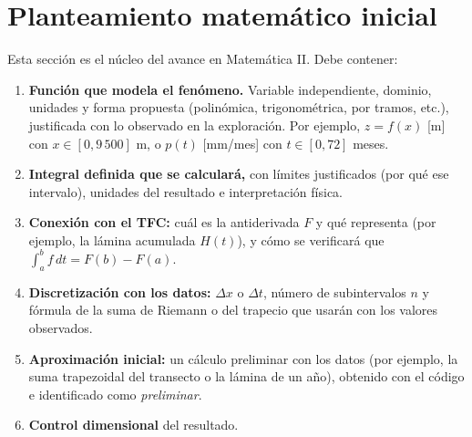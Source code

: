 \documentclass[11pt,a4paper]{article}
\begin{document}
\section{Planteamiento matemático inicial}

Esta sección es el núcleo del avance en Matemática II. Debe contener:
\begin{enumerate}[label=\alph*)]
  \item \textbf{Función que modela el fenómeno.} Variable independiente, dominio, unidades y forma propuesta (polinómica, trigonométrica, por tramos, etc.), justificada con lo observado en la exploración. Por ejemplo, $z=f(x)$ [m] con $x\in[0,9\,500]$ m, o $p(t)$ [mm/mes] con $t\in[0,72]$ meses.
  \item \textbf{Integral definida que se calculará,} con límites justificados (por qué ese intervalo), unidades del resultado e interpretación física.
  \item \textbf{Conexión con el TFC:} cuál es la antiderivada $F$ y qué representa (por ejemplo, la lámina acumulada $H(t)$), y cómo se verificará que $\int_a^b f\,dt=F(b)-F(a)$.
  \item \textbf{Discretización con los datos:} $\Delta x$ o $\Delta t$, número de subintervalos $n$ y fórmula de la suma de Riemann o del trapecio que usarán con los valores observados.
  \item \textbf{Aproximación inicial:} un cálculo preliminar con los datos (por ejemplo, la suma trapezoidal del transecto o la lámina de un año), obtenido con el código e identificado como \emph{preliminar}.
  \item \textbf{Control dimensional} del resultado.
\end{enumerate}
\end{document}

